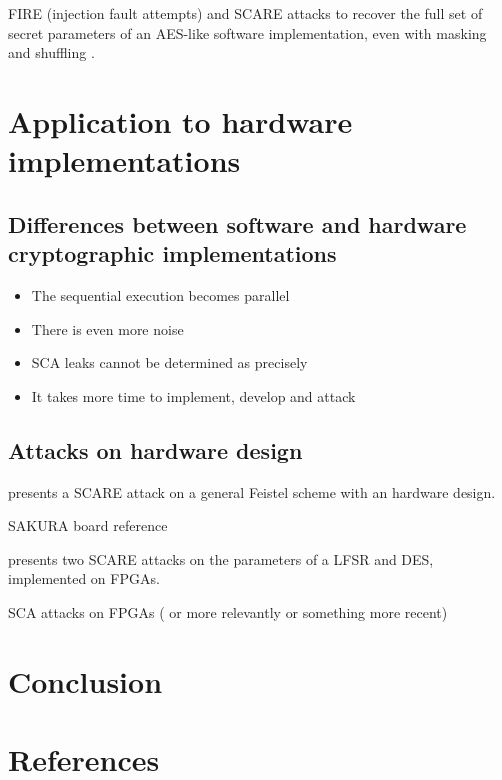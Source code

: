 \documentclass[11pt]{sdm}
\begin{document}
FIRE (injection fault attempts) and SCARE attacks to recover the full set of secret parameters of an AES-like software implementation, even with masking and shuffling \parencite{Clavier_Isorez_Marion_Wurcker_2015}.

\section{Application to hardware implementations}

\subsection{Differences between software and hardware cryptographic implementations}

\begin{itemize}
    \item The sequential execution becomes parallel
    \item There is even more noise
    \item SCA leaks cannot be determined as precisely
    \item It takes more time to implement, develop and attack
\end{itemize}

\subsection{Attacks on hardware design}

\parencite{Réal_Dubois_Guilloux_Valette_Drissi_2008} presents a SCARE attack on a general Feistel scheme with an hardware design.

SAKURA board reference

\parencite{Guilley_Sauvage_Micolod_Réal_Valette_2010} presents two SCARE attacks on the parameters of a LFSR and DES, implemented on FPGAs.

SCA attacks on FPGAs (\parencite{Peeters_Standaert_Donckers_Quisquater_2005} or more relevantly \parencite{Standaert_Ors_Preneel_2004} or something more recent)


\section{Conclusion}

\section*{References}

\printbibliography
\end{document}
